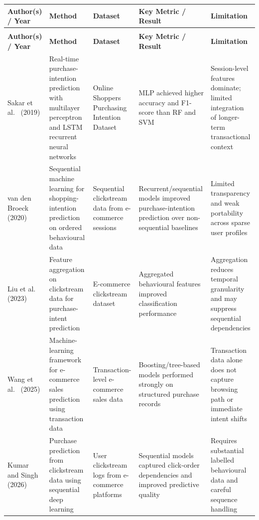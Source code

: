 \documentclass[12pt,a4paper]{article}
\begin{document}
\begingroup
\footnotesize
{}
\begin{longtable}{>{\raggedright}p{2.8cm}
                  >{\raggedright}p{3.1cm}
                  >{\raggedright}p{2.6cm}
                  >{\raggedright}p{2.2cm}
                  >{\raggedright\arraybackslash}p{2.6cm}}
\toprule
\textbf{Author(s) / Year} & \textbf{Method} & \textbf{Dataset} &
\textbf{Key Metric / Result} & \textbf{Limitation} \\
\midrule
\endfirsthead
\multicolumn{5}{c}{\small\itshape (continued from previous page)}\\
\toprule
\textbf{Author(s) / Year} & \textbf{Method} & \textbf{Dataset} &
\textbf{Key Metric / Result} & \textbf{Limitation} \\
\midrule
\endhead
\bottomrule
\endfoot

Sakar et al.\ \cite{sakar2019realtime} (2019)
  & Real-time purchase-intention prediction with multilayer perceptron and LSTM recurrent neural networks
  & Online Shoppers Purchasing Intention Dataset
  & MLP achieved higher accuracy and F1-score than RF and SVM
  & Session-level features dominate; limited integration of longer-term transactional context \\
\addlinespace

van den Broeck \cite{broeck2020sequential} (2020)
  & Sequential machine learning for shopping-intention prediction on ordered behavioural data
  & Sequential clickstream data from e-commerce sessions
  & Recurrent/sequential models improved purchase-intention prediction over non-sequential baselines
  & Limited transparency and weak portability across sparse user profiles \\
\addlinespace

Liu et al.\ \cite{liu2023feature} (2023)
  & Feature aggregation on clickstream data for purchase-intent prediction
  & E-commerce clickstream dataset
  & Aggregated behavioural features improved classification performance
  & Aggregation reduces temporal granularity and may suppress sequential dependencies \\
\addlinespace

Wang et al.\ \cite{wang2025sales} (2025)
  & Machine-learning framework for e-commerce sales prediction using transaction data
  & Transaction-level e-commerce sales data
  & Boosting/tree-based models performed strongly on structured purchase records
  & Transaction data alone does not capture browsing path or immediate intent shifts \\
\addlinespace

Kumar and Singh \cite{kumar2026clickstream} (2026)
  & Purchase prediction from clickstream data using sequential deep learning
  & User clickstream logs from e-commerce platforms
  & Sequential models captured click-order dependencies and improved predictive quality
  & Requires substantial labelled behavioural data and careful sequence handling \\
\bottomrule
\end{longtable}
\endgroup
\end{document}
